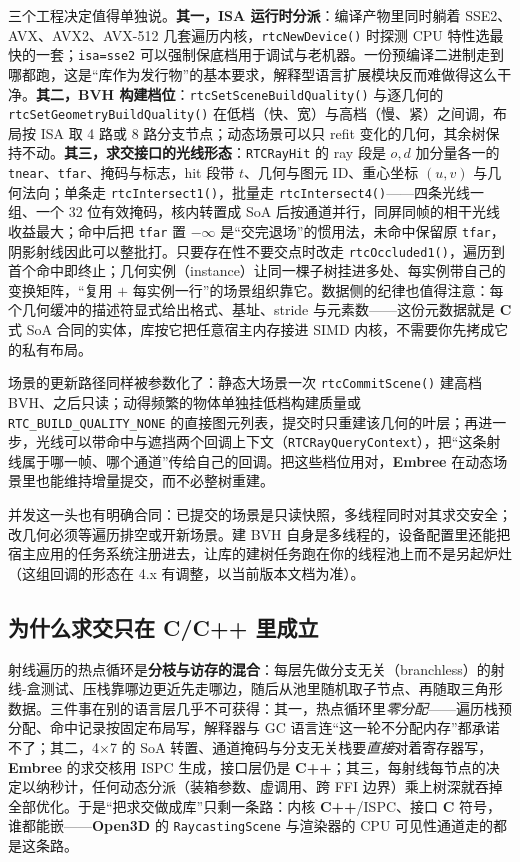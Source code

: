 \documentclass[12pt,a4paper,fontset=fandol]{ctexbook}
\newcommand{\Fn}[1]{\texttt{#1()}}
\newcommand{\Tp}[1]{\texttt{#1}}
\newcommand{\Lib}[1]{\textbf{#1}}
\newcommand{\Lang}[1]{\textsf{\bfseries #1}}
\newcommand{\CL}{\Lang{C}}
\newcommand{\CPP}{\Lang{C++}}
\begin{document}
三个工程决定值得单独说。\textbf{其一，ISA 运行时分派}：编译产物里同时躺着 SSE2、AVX、AVX2、AVX-512 几套遍历内核，\Fn{rtcNewDevice} 时探测 CPU 特性选最快的一套；\Tp{isa=sse2} 可以强制保底档用于调试与老机器。一份预编译二进制走到哪都跑，这是``库作为发行物''的基本要求，解释型语言扩展模块反而难做得这么干净。\textbf{其二，BVH 构建档位}：\Fn{rtcSetSceneBuildQuality} 与逐几何的 \Fn{rtcSetGeometryBuildQuality} 在低档（快、宽）与高档（慢、紧）之间调，布局按 ISA 取 4 路或 8 路分支节点；动态场景可以只 refit 变化的几何，其余树保持不动。\textbf{其三，求交接口的光线形态}：\Tp{RTCRayHit} 的 ray 段是 $o,d$ 加分量各一的 \Tp{tnear}、\Tp{tfar}、掩码与标志，hit 段带 $t$、几何与图元 ID、重心坐标 $(u,v)$ 与几何法向；单条走 \Fn{rtcIntersect1}，批量走 \Fn{rtcIntersect4}——四条光线一组、一个 32 位有效掩码，核内转置成 SoA 后按通道并行，同屏同帧的相干光线收益最大；命中后把 \Tp{tfar} 置 $-\infty$ 是``交完退场''的惯用法，未命中保留原 \Tp{tfar}，阴影射线因此可以整批打。只要存在性不要交点时改走 \Fn{rtcOccluded1}，遍历到首个命中即终止；几何实例（instance）让同一棵子树挂进多处、每实例带自己的变换矩阵，``复用 $+$ 每实例一行''的场景组织靠它。数据侧的纪律也值得注意：每个几何缓冲的描述符显式给出格式、基址、stride 与元素数——这份元数据就是 \CL{} 式 SoA 合同的实体，库按它把任意宿主内存接进 SIMD 内核，不需要你先拷成它的私有布局。

场景的更新路径同样被参数化了：静态大场景一次 \Fn{rtcCommitScene} 建高档 BVH、之后只读；动得频繁的物体单独挂低档构建质量或 \Tp{RTC\allowbreak\_BUILD\allowbreak\_QUALITY\allowbreak\_NONE} 的直接图元列表，提交时只重建该几何的叶层；再进一步，光线可以带命中与遮挡两个回调上下文（\Tp{RTCRayQueryContext}），把``这条射线属于哪一帧、哪个通道''传给自己的回调。把这些档位用对，\Lib{Embree} 在动态场景里也能维持增量提交，而不必整树重建。

并发这一头也有明确合同：已提交的场景是只读快照，多线程同时对其求交安全；改几何必须等遍历排空或开新场景。建 BVH 自身是多线程的，设备配置里还能把宿主应用的任务系统注册进去，让库的建树任务跑在你的线程池上而不是另起炉灶（这组回调的形态在 4.x 有调整，以当前版本文档为准）。

\subsection{为什么求交只在 \CL/\CPP{} 里成立}

射线遍历的热点循环是\textbf{分枝与访存的混合}：每层先做分支无关（branchless）的射线-盒测试、压栈靠哪边更近先走哪边，随后从池里随机取子节点、再随取三角形数据。三件事在别的语言层几乎不可获得：其一，热点循环里\emph{零分配}——遍历栈预分配、命中记录按固定布局写，解释器与 GC 语言连``这一轮不分配内存''都承诺不了；其二，4$\times$7 的 SoA 转置、通道掩码与分支无关栈要\emph{直接}对着寄存器写，\Lib{Embree} 的求交核用 ISPC 生成，接口层仍是 \CPP{}；其三，每射线每节点的决定以纳秒计，任何动态分派（装箱参数、虚调用、跨 FFI 边界）乘上树深就吞掉全部优化。于是``把求交做成库''只剩一条路：内核 \CPP{}/ISPC、接口 \CL{} 符号，谁都能嵌——\Lib{Open3D} 的 \Tp{RaycastingScene} 与渲染器的 CPU 可见性通道走的都是这条路。
\end{document}
